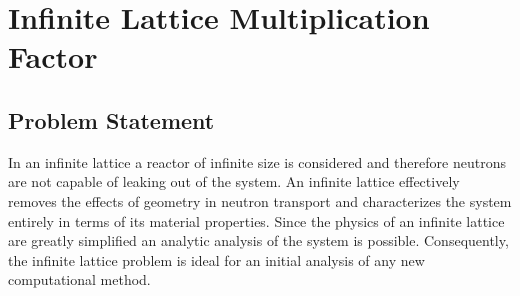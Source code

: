 \section{Infinite Lattice Multiplication Factor}
\label{sec:infinite_lattice}

\subsection{Problem Statement}
\label{subsec:infinite_lattice_ps}

In an infinite lattice a reactor of infinite size is considered and therefore neutrons are not capable of leaking out of the system. An infinite lattice effectively removes the effects of geometry in neutron transport and characterizes the system entirely in terms of its material properties. Since the physics of an infinite lattice are greatly simplified an analytic analysis of the system is possible. Consequently, the infinite lattice problem is ideal for an initial analysis of any new computational method. 

